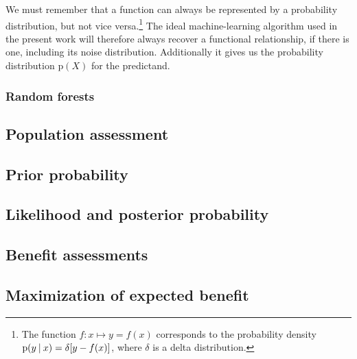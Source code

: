 \documentclass[utf8]{FrontiersinHarvard} %
\newcommand*{\p}{\mathrm{p}}%
\renewcommand*{\|}[1][]{\nonscript\:#1\vert\nonscript\:\mathopen{}}
\begin{document}
We must remember that a function can always be represented by a probability distribution, but not vice versa.\footnote{The function $f\colon x \mapsto y=f(x)$ corresponds to the probability density $\p(y\|x) = \delta[y-f(x)]$, where $\delta$ is a delta distribution.} The ideal machine-learning algorithm used in the present work will therefore always recover a functional relationship, if there is one, including its noise distribution. Additionally it gives us the probability distribution $\p(X)$ for the predictand.

\subsubsection{Random forests}
\label{sec:random_forests}





\subsection{Population assessment}
\label{sec:population_step}

 \citep{lindleyetal1981,sprengeretal2021,barhillel1980}

\subsection{Prior probability}
\label{sec:prior_step}

 \citep{lindleyetal1981,sprengeretal2021,barhillel1980}

\subsection{Likelihood and posterior probability}
\label{sec:posterior_step}

 \citep{lindleyetal1981,sprengeretal2021,barhillel1980}


\subsection{Benefit assessments}
\label{sec:utilities_step}

 \citep{soxetal1988_r2013,huninketal2001_r2014}

\subsection{Maximization of expected benefit}
\label{sec:expected_utility_step}
\end{document}
